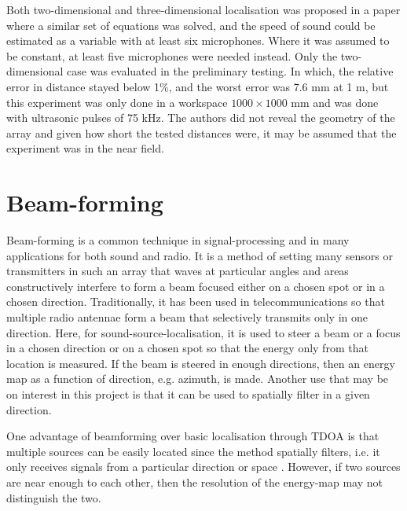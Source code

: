 \documentclass[notitlepage]{report}
\begin{document}
Both two-dimensional and three-dimensional localisation was proposed in a paper \cite{mahajan_3d_2001} where a similar set of equations was solved, and the speed of sound could be estimated as a variable with at least six microphones. Where it was assumed to be constant, at least five microphones were needed instead. Only the two-dimensional case was evaluated in the preliminary testing. In which, the relative error in distance stayed below 1\%, and the worst error was 7.6 \si{mm} at 1 \si{m}, but this experiment was only done in a workspace $1000\times 1000$ \si{mm} and was done with ultrasonic pulses of 75 \si{kHz}. The authors did not reveal the geometry of the array and given how short the tested distances were, it may be assumed that the experiment was in the near field.

\section{Beam-forming}

Beam-forming is a common technique in signal-processing and in many applications for both sound and radio. It is a method of setting many sensors or transmitters in such an array that waves at particular angles and areas constructively interfere to form a beam focused either on a chosen spot or in a chosen direction. Traditionally, it has been used in telecommunications so that multiple radio antennae form a beam that selectively transmits only in one direction. Here, for sound-source-localisation, it is used to steer a beam or a focus in a chosen direction or on a chosen spot so that the energy only from that location is measured. If the beam is steered in enough directions, then an energy map as a function of direction, e.g. azimuth, is made. Another use that may be on interest in this project is that it can be used to spatially filter in a given direction.

One advantage of beamforming over basic localisation through TDOA is that multiple sources can be easily located since the method spatially filters, i.e. it only receives signals from a particular direction or space \cite{rascon_localization_2017}. However, if two sources are near enough to each other, then the resolution of the energy-map may not distinguish the two.
\end{document}
